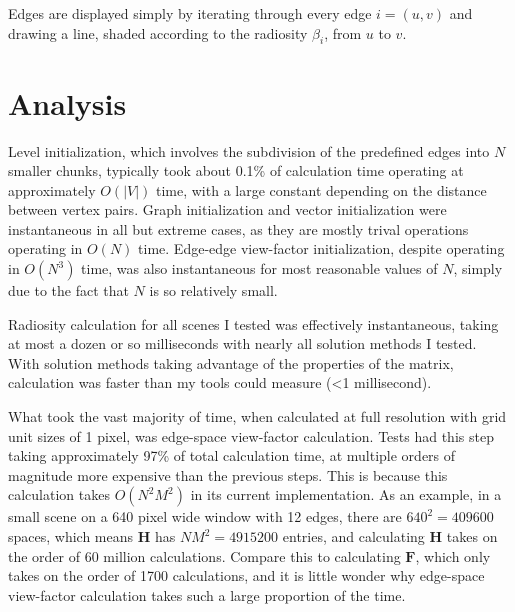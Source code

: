 \documentclass[letter]{article}
\newcommand{\vect}[1]{\boldsymbol{#1}}
\begin{document}
Edges are displayed simply by iterating through every edge $i=(u, v)$ and drawing a line, shaded according to the  radiosity $\beta_i$, from $u$ to $v$.

\section{Analysis}
Level initialization, which involves the subdivision of the predefined edges into $N$ smaller chunks, typically took about 0.1\% of calculation time operating at approximately $O(|V|)$ time, with a large constant depending on the distance between vertex pairs. Graph initialization and vector initialization were instantaneous in all but extreme cases, as they are mostly trival operations operating in $O(N)$ time. Edge-edge view-factor initialization, despite operating in $O(N^3)$ time, was also instantaneous for most reasonable values of $N$, simply due to the fact that $N$ is so relatively small.

Radiosity calculation for all scenes I tested was effectively instantaneous, taking at most a dozen or so milliseconds with nearly all solution methods I tested. With solution methods taking advantage of the properties of the matrix, calculation was faster than my tools could measure (\textless 1 millisecond).

What took the vast majority of time, when calculated at full resolution with grid unit sizes of 1 pixel, was edge-space view-factor calculation. Tests had this step taking approximately 97\% of total calculation time, at multiple orders of magnitude more expensive than the previous steps. This is because this calculation takes $O(N^2M^2)$ in its current implementation. As an example, in a small scene on a 640 pixel wide window with 12 edges, there are $640^2=409600$ spaces, which means $\vect{H}$ has $NM^2=4915200$ entries, and calculating $\vect{H}$ takes on the order of 60 million calculations. Compare this to calculating $\vect{F}$, which only takes on the order of 1700 calculations, and it is little wonder why edge-space view-factor calculation takes such a large proportion of the time.
\end{document}
